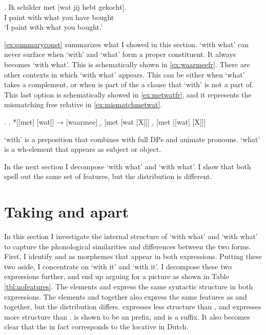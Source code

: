 \documentclass[12pt]{article}
\begin{document}
\exg. Ik schilder met [wat jij hebt gekocht].\\
 I paint with what you have bought\\
 `I paint with what you bought.'\label{ex:mismatchmetwat}

\ref{ex:summaryconst} summarizes what I showed in this section.  `with what' can never surface when  `with' and  `what' form a proper constituent. It always becomes  `with what'. This is schematically shown in \ref{ex:waarmeefr}.
There are other contexts in which  `with what' appears. This can be either when  `what' takes a complement, or when  is part of the a clause that  `with' is not a part of. This last option is schematically showed in \ref{ex:metwatfr}, and it represents the mismatching free relative in \ref{ex:mismatchmetwat}.

\ex.\label{ex:summaryconst}
\a. *[[met] [wat]] → [waarmee]\label{ex:waarmeefr}
\b. [met [wat [X]]]
\b. [met [[wat] [X]]]\label{ex:metwatfr}

 `with' is a preposition that combines with full DPs and animate pronouns.  `what' is a wh-element that appears as subject or object.

In the next section I decompose  `with what' and  `with what'. I show that both spell out the same set of features, but the distribution is different.



\section{Taking  and  apart}

In this section I investigate the internal structure of  `with what' and  `with what' to capture the phonological similarities and differences between the two forms. First, I identify  and  as morphemes that appear in both expressions. Putting these two aside, I concentrate on  `with it' and  `with it'. I decompose these two expressions further, and end up arguing for a picture as shown in Table \ref{tbl:nofeatures}.
The elements  and  express the same syntactic structure in both expressions. The elements  and  together also express the same features as  and  together, but the distribution differs.  expresses less structure than , and  expresses more structure than .  is shown to be an prefix, and  is a suffix. It also becomes clear that the  in fact corresponds to the locative  in Dutch.
\end{document}
